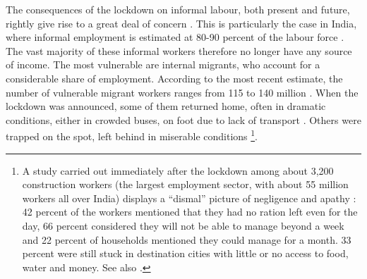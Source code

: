 \documentclass[a4paper, 11pt, onecolumn]{article}
\begin{document}
The consequences of the lockdown on informal labour, both present and future, rightly give rise to a great deal of concern \citep{ILO2020, Majid2020}. 
This is particularly the case in India, where informal employment is estimated at 80-90 percent of the labour force \citep{ILO2016, Harriss-White2020, Srivastava2020}. 
The vast majority of these informal workers therefore no longer have any source of income.
The most vulnerable are internal migrants, who account for a considerable share of employment. 
According to the most recent estimate, the number of vulnerable migrant workers ranges from 115 to 140 million \citep{Srivastava2020}. 
When the lockdown was announced, some of them returned home, often in dramatic conditions, either in crowded buses, on foot due to lack of transport \citep{Bhagat2020, Mukho2020, Picherit2020}. 
Others were trapped on the spot, left behind in miserable conditions \citep{Sahas2020}\footnote{A study carried out immediately after the lockdown among about 3,200 construction workers (the largest employment sector, with about 55 million workers all over India) displays a “dismal” picture of negligence and apathy \citep[i]{Sahas2020}: 42 percent of the workers mentioned that they had no ration left even for the day, 66 percent considered they will not be able to manage beyond a week and 22 percent of households mentioned they could manage for a month. 33 percent were still stuck in destination cities with little or no access to food, water and money. See also \cite{Bercegol2020}.}.  
\end{document}
